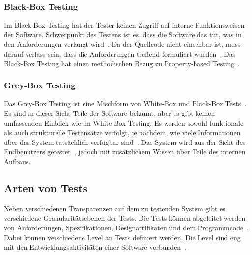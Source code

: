 \subsubsection{Black-Box Testing}

Im Black-Box Testing hat der Tester keinen Zugriff auf interne Funktionsweisen der Software.
Schwerpunkt des Testens ist es, dass die Software das tut, was in den Anforderungen verlangt wird~\cite[vgl. Specification-Based Testing]{software-testing-craftmans}.
Da der Quellcode nicht einsehbar ist, muss darauf verlass sein, dass die Anforderungen treffend formuliert wurden~\cite[vgl.]{testmanagment}.
Das Black-Box Testing hat einen methodischen Bezug zu Property-based Testing~\cite{property-based-testing}.

\subsubsection{Grey-Box Testing}

Das Grey-Box Testing ist eine Mischform von White-Box und Black-Box Tests~\cite[vgl.]{testmanagment}.
Es sind in dieser Sicht Teile der Software bekannt, aber es gibt keinen umfassenden Einblick wie im White-Box Testing.
Es werden sowohl funktionale als auch strukturelle Testansätze verfolgt, je nachdem, wie viele Informationen über das System tatsächlich
verfügbar sind~\cite[vgl.]{graybox}.
Das System wird aus der Sicht des Endbenutzers getestet~\cite[vgl.]{testmanagment}, jedoch mit zusätzlichem Wissen über Teile des internen Aufbaus.

\subsection{Arten von Tests}

Neben verschiedenen Transparenzen auf dem zu testenden System gibt es verschiedene Granularitätsebenen der Tests.
Die Tests können abgeleitet werden von Anforderungen, Spezifikationen, Designartifikaten und dem Programmcode~\cite[vgl. 1.1.1 Testing Levels Based on Software Activity]{software-testing}.
Dabei können verschiedene Level an Tests definiert werden.
Die Level sind eng mit den Entwicklungsaktivitäten einer Software verbunden~\cite[vgl. 1.1.1]{software-testing}.

